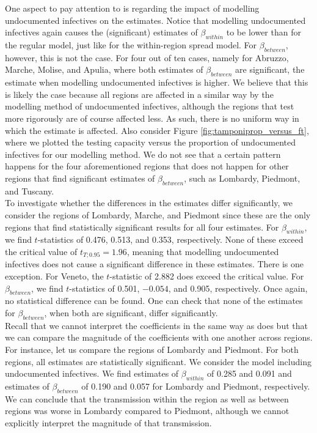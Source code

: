\documentclass[12pt]{article}
\begin{document}
	One aspect to pay attention to is regarding the impact of modelling undocumented infectives on the estimates. Notice that modelling undocumented infectives again causes the (significant) estimates of $\beta_{within}$ to be lower than for the regular model, just like for the within-region spread model. For $\beta_{between}$, however, this is not the case. For four out of ten cases, namely for Abruzzo, Marche, Molise, and Apulia, where both estimates of $\beta_{between}$ are significant, the estimate when modelling undocumented infectives is higher. We believe that this is likely the case because all regions are affected in a similar way by the modelling method of undocumented infectives, although the regions that test more rigorously are of course affected less. As such, there is no uniform way in which the estimate is affected. Also consider Figure \ref{fig:tamponiprop_versus_ft}, where we plotted the testing capacity versus the proportion of undocumented infectives for our modelling method. We do not see that a certain pattern happens for the four aforementioned regions that does not happen for other regions that find significant estimates of $\beta_{between}$, such as Lombardy, Piedmont, and Tuscany. \\
	
	To investigate whether the differences in the estimates differ significantly, we consider the regions of Lombardy, Marche, and Piedmont since these are the only regions that find statistically significant results for all four estimates. For $\beta_{within}$, we find $t$-statistics of 0.476, 0.513, and 0.353, respectively. None of these exceed the critical value of $t_{T;0.95} = 1.96$, meaning that modelling undocumented infectives does not cause a significant difference in these estimates. There is one exception. For Veneto, the $t$-statistic of 2.882 does exceed the critical value. For $\beta_{between}$, we find $t$-statistics of 0.501, $-0.054$, and 0.905, respectively. Once again, no statistical difference can be found. One can check that none of the estimates for $\beta_{between}$, when both are significant, differ significantly. \\
	
	Recall that we cannot interpret the coefficients in the same way as \textcite{adda2016economic} does but that we can compare the magnitude of the coefficients with one another across regions. For instance, let us compare the regions of Lombardy and Piedmont. For both regions, all estimates are statistically significant. We consider the model including undocumented infectives. We find estimates of $\beta_{within}$ of 0.285 and 0.091 and estimates of $\beta_{between}$ of 0.190 and 0.057 for Lombardy and Piedmont, respectively. We can conclude that the transmission within the region as well as between regions was worse in Lombardy compared to Piedmont, although we cannot explicitly interpret the magnitude of that transmission. \\
	
\end{document}
